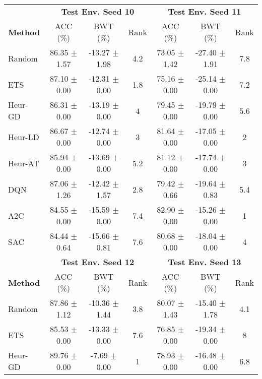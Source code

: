 \begin{tabular}{lcccccc}
	\toprule 
	& \multicolumn{3}{c}{\textbf{Test Env. Seed 10}} & \multicolumn{3}{c}{\textbf{Test Env. Seed 11}} \\
	\cmidrule(lr){2-4} \cmidrule(lr){5-7}
	\textbf{Method} & ACC (\%)          & BWT (\%)          & Rank   & ACC (\%)          & BWT (\%)          & Rank   \\
	\midrule 
	Random          & 86.35 $\pm$ 1.57    & -13.27 $\pm$ 1.98   & 4.2    & 73.05 $\pm$ 1.42    & -27.40 $\pm$ 1.91   & 7.8    \\
	ETS             & 87.10 $\pm$ 0.00    & -12.31 $\pm$ 0.00   & 1.8    & 75.16 $\pm$ 0.00    & -25.14 $\pm$ 0.00   & 7.2    \\
	Heur-GD         & 86.31 $\pm$ 0.00    & -13.19 $\pm$ 0.00   & 4      & 79.45 $\pm$ 0.00    & -19.79 $\pm$ 0.00   & 5.6    \\
	Heur-LD         & 86.67 $\pm$ 0.00    & -12.74 $\pm$ 0.00   & 3      & 81.64 $\pm$ 0.00    & -17.05 $\pm$ 0.00   & 2      \\
	Heur-AT         & 85.94 $\pm$ 0.00    & -13.69 $\pm$ 0.00   & 5.2    & 81.12 $\pm$ 0.00    & -17.74 $\pm$ 0.00   & 3      \\
	DQN             & 87.06 $\pm$ 1.26    & -12.42 $\pm$ 1.57   & 2.8    & 79.42 $\pm$ 0.66    & -19.64 $\pm$ 0.83   & 5.4    \\
	A2C             & 84.55 $\pm$ 0.00    & -15.59 $\pm$ 0.00   & 7.4    & 82.90 $\pm$ 0.00    & -15.26 $\pm$ 0.00   & 1      \\
	SAC             & 84.44 $\pm$ 0.64    & -15.66 $\pm$ 0.81   & 7.6    & 80.68 $\pm$ 0.00    & -18.04 $\pm$ 0.00   & 4      \\
	\midrule 
	& \multicolumn{3}{c}{\textbf{Test Env. Seed 12}} & \multicolumn{3}{c}{\textbf{Test Env. Seed 13}} \\
	\cmidrule(lr){2-4} \cmidrule(lr){5-7}
	\textbf{Method} & ACC (\%)          & BWT (\%)          & Rank   & ACC (\%)          & BWT (\%)          & Rank   \\
	\midrule 
	Random          & 87.86 $\pm$ 1.12    & -10.36 $\pm$ 1.44   & 3.8    & 80.07 $\pm$ 1.43    & -15.40 $\pm$ 1.78   & 4.1    \\
	ETS             & 85.53 $\pm$ 0.00    & -13.33 $\pm$ 0.00   & 7.6    & 76.85 $\pm$ 0.00    & -19.34 $\pm$ 0.00   & 8      \\
	Heur-GD         & 89.76 $\pm$ 0.00    & -7.69 $\pm$ 0.00    & 1      & 78.93 $\pm$ 0.00    & -16.48 $\pm$ 0.00   & 6.8    \\

\end{tabular}
